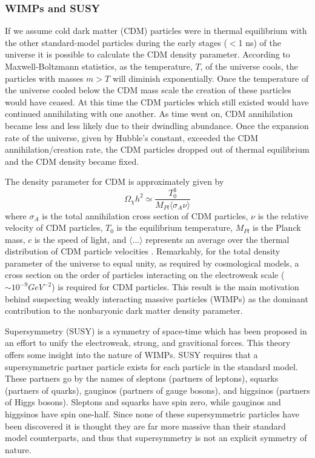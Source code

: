 \documentclass[a4paper,12pt]{article}
\begin{document}
\subsubsection{WIMPs and SUSY} \label{WIMPSandSUSY}

If we assume cold dark matter (CDM) particles were in thermal equilibrium with the other standard-model particles during the early stages ($<$1 ns) of the universe it is possible to calculate the CDM density parameter.  According to Maxwell-Boltzmann statistics, as the temperature, $T$, of the universe cools, the particles with masses $m > T$ will diminish exponentially.  Once the temperature of the universe cooled below the CDM mass scale the creation of these particles would have ceased.  At this time the CDM particles which still existed would have continued annihilating with one another.  As time went on, CDM annihilation became less and less likely due to their dwindling abundance.  Once the expansion rate of the universe, given by Hubble's constant, exceeded the CDM annihilation/creation rate, the CDM particles dropped out of thermal equilibrium and the CDM density became fixed.  

The density parameter for CDM is approximately given by
\[\Omega_\chi h^2 \simeq \frac{T_0^3}{M_{Pl} \langle \sigma_A \nu \rangle} \]
where $\sigma_A$ is the total annihilation cross section of CDM particles, $\nu$ is the relative velocity of CDM particles, $T_0$ is the equilibrium temperature, $M_{Pl}$ is the Planck mass, $c$ is the speed of light, and $\langle ... \rangle$ represents an average over the thermal distribution of CDM particle velocities \cite{Kolb,Jungman}. Remarkably, for the total density parameter of the universe to equal unity, as required by cosmological models, a cross section on the order of particles interacting on the electroweak scale ($\sim 10^{-9} GeV^{-2}$) is required for CDM particles. This result is the main motivation behind suspecting weakly interacting massive particles (WIMPs) as the dominant contribution to the nonbaryonic dark matter density parameter.  

Supersymmetry (SUSY) is a symmetry of space-time which has been proposed in an effort to unify the electroweak, strong, and gravitional forces.  This theory offers some insight into the nature of WIMPs.  SUSY requires that a supersymmetric partner particle exists for each particle in the standard model.  These partners go by the names of sleptons (partners of leptons), squarks (partners of quarks), gauginos (partners of gauge bosons), and higgsinos (partners of Higgs bosons).  Sleptons and squarks have spin zero, while gauginos and higgsinos have spin one-half.  Since none of these supersymmetric particles have been discovered it is thought they are far more massive than their standard model counterparts, and thus that supersymmetry is not an explicit symmetry of nature.
  
\end{document}
